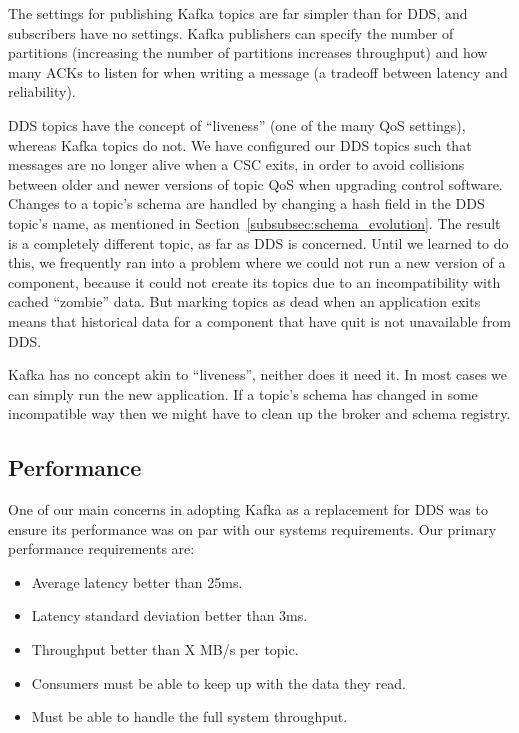 \documentclass[]{spie}  %
\begin{document}
The settings for publishing Kafka topics are far simpler than for DDS, and subscribers have no settings.
Kafka publishers can specify the number of partitions (increasing the number of partitions increases throughput) and how many ACKs to listen for when writing a message (a tradeoff between latency and reliability).

DDS topics have the concept of “liveness” (one of the many QoS settings), whereas Kafka topics do not.
We have configured our DDS topics such that messages are no longer alive when a CSC exits, in order to avoid collisions between older and newer versions of topic QoS when upgrading control software.
Changes to a topic’s schema are handled by changing a hash field in the DDS topic’s name, as mentioned in Section~\ref{subsubsec:schema_evolution}.
The result is a completely different topic, as far as DDS is concerned.
Until we learned to do this, we frequently ran into a problem where we could not run a new version of a component, because it could not create its topics due to an incompatibility with cached “zombie” data.
But marking topics as dead when an application exits means that historical data for a component that have quit is not unavailable from DDS.

Kafka has no concept akin to “liveness”, neither does it need it.
In most cases we can simply run the new application.
If a topic’s schema has changed in some incompatible way then we might have to clean up the broker and schema registry.

\subsection{Performance}
\label{subsec:performance}

One of our main concerns in adopting Kafka as a replacement for DDS was to ensure its performance was on par with our systems requirements.
Our primary performance requirements are:

\begin{itemize}
  \item Average latency better than 25ms.
  \item Latency standard deviation better than 3ms.
  \item Throughput better than X MB/s per topic.
  \item Consumers must be able to keep up with the data they read.
  \item Must be able to handle the full system throughput.
\end{itemize}
\end{document}
